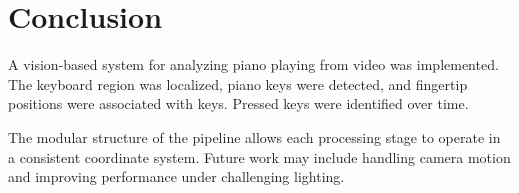 \section{Conclusion}

A vision-based system for analyzing piano playing
from video was implemented.
The keyboard region was localized,
piano keys were detected,
and fingertip positions were associated with keys.
Pressed keys were identified over time.

The modular structure of the pipeline
allows each processing stage to operate
in a consistent coordinate system.
Future work may include handling camera motion
and improving performance under challenging lighting.
